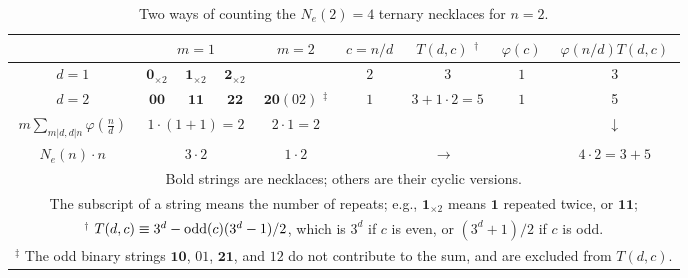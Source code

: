 \documentclass[twocolumn]{revtex4-1}
\begin{document}
\begin{table*}[t]\footnotesize
\caption{Two ways of counting the $N_e(2) = 4$ ternary necklaces for $n = 2$.
}
\begin{center}
\begin{tabularx}{.8 \linewidth}{c | c  c c | c  | c | c | c | c }
\hline
        & \multicolumn{3}{c|}{$m = 1$}
        & $m = 2$
        & $c = n/d$
        & $T(d, c)$ $^\dagger$
        & $\varphi(c)$ & $\varphi(n/d) T(d, c)$\\
\hline
$d = 1$ & \hspace{1mm} $\mathbf{0}_{\times2}$ \hspace{1mm}
        & \hspace{1mm} $\mathbf{1}_{\times2}$ \hspace{1mm}
        & \hspace{1mm} $\mathbf{2}_{\times2}$ \hspace{1mm}
        & & $2$ & $3$ & $1$ & 3 \\
\hline
$d = 2$ & $\mathbf{00}$
        & $\mathbf{11}$
        & $\mathbf{22}$
        & \hspace{1mm} $\mathbf{20} (02)$ $^\ddagger$ \hspace{1mm}
        & $1$ & $3+1\cdot2=5$ & $1$ & 5 \\
\hline
$m \sum_{m|d, d|n} \varphi(\frac{n}{d})$
      & \multicolumn{3}{c|}{$1\cdot(1+1) = 2$}
      & $2\cdot1 = 2$ &    \multicolumn{3}{c|}{} &  $\downarrow$\\
\hline
$N_e(n)\cdot n$
    & \multicolumn{3}{c|}{$3 \cdot 2$} & $1 \cdot 2$ &
  \multicolumn{3}{c|}{$\rightarrow$} & $4\cdot2 = 3 + 5$ \\
\hline
\multicolumn{9}{p{.8 \linewidth}}{
  Bold strings are necklaces; others are their cyclic versions.
}
\\
\multicolumn{9}{p{.8 \linewidth}}{
The subscript of a string means the number of repeats;
e.g.,
$\mathbf{1}_{\times2}$ means $\mathbf{1}$ repeated twice, or $\mathbf{11}$;
}
\\
\multicolumn{9}{p{.8 \linewidth}}{
$^\dagger$ $T(d, c) \equiv 3^d - \mathrm{odd}(c)(3^d-1)/2$,
which is $3^d$ if $c$ is even,
or $(3^d+1)/2$ if $c$ is odd.
}
\\
\multicolumn{9}{p{.8 \linewidth}}{
$^\ddagger$
The odd binary strings $\mathbf{10}$, $01$, $\mathbf{21}$, and $12$
  do not contribute to the sum, and are excluded from $T(d, c)$.
}
\\
\hline
\end{tabularx}
\end{center}
\label{tab:countcubnecklace}
\end{table*}
\end{document}
